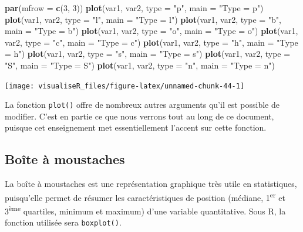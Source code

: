 \documentclass[]{article}
\newenvironment{Shaded}{\begin{snugshade}}{\end{snugshade}}
\newcommand{\DataTypeTok}[1]{\textcolor[rgb]{0.13,0.29,0.53}{#1}}
\newcommand{\DecValTok}[1]{\textcolor[rgb]{0.00,0.00,0.81}{#1}}
\newcommand{\KeywordTok}[1]{\textcolor[rgb]{0.13,0.29,0.53}{\textbf{#1}}}
\newcommand{\NormalTok}[1]{#1}
\newcommand{\StringTok}[1]{\textcolor[rgb]{0.31,0.60,0.02}{#1}}
\begin{document}
\begin{Shaded}
\begin{Highlighting}[]
\KeywordTok{par}\NormalTok{(}\DataTypeTok{mfrow =} \KeywordTok{c}\NormalTok{(}\DecValTok{3}\NormalTok{, }\DecValTok{3}\NormalTok{))}
\KeywordTok{plot}\NormalTok{(var1, var2, }\DataTypeTok{type =} \StringTok{"p"}\NormalTok{, }\DataTypeTok{main =} \StringTok{"Type = p"}\NormalTok{)}
\KeywordTok{plot}\NormalTok{(var1, var2, }\DataTypeTok{type =} \StringTok{"l"}\NormalTok{, }\DataTypeTok{main =} \StringTok{"Type = l"}\NormalTok{)}
\KeywordTok{plot}\NormalTok{(var1, var2, }\DataTypeTok{type =} \StringTok{"b"}\NormalTok{, }\DataTypeTok{main =} \StringTok{"Type = b"}\NormalTok{)}
\KeywordTok{plot}\NormalTok{(var1, var2, }\DataTypeTok{type =} \StringTok{"o"}\NormalTok{, }\DataTypeTok{main =} \StringTok{"Type = o"}\NormalTok{)}
\KeywordTok{plot}\NormalTok{(var1, var2, }\DataTypeTok{type =} \StringTok{"c"}\NormalTok{, }\DataTypeTok{main =} \StringTok{"Type = c"}\NormalTok{)}
\KeywordTok{plot}\NormalTok{(var1, var2, }\DataTypeTok{type =} \StringTok{"h"}\NormalTok{, }\DataTypeTok{main =} \StringTok{"Type = h"}\NormalTok{)}
\KeywordTok{plot}\NormalTok{(var1, var2, }\DataTypeTok{type =} \StringTok{"s"}\NormalTok{, }\DataTypeTok{main =} \StringTok{"Type = s"}\NormalTok{)}
\KeywordTok{plot}\NormalTok{(var1, var2, }\DataTypeTok{type =} \StringTok{"S"}\NormalTok{, }\DataTypeTok{main =} \StringTok{"Type = S"}\NormalTok{)}
\KeywordTok{plot}\NormalTok{(var1, var2, }\DataTypeTok{type =} \StringTok{"n"}\NormalTok{, }\DataTypeTok{main =} \StringTok{"Type = n"}\NormalTok{)}
\end{Highlighting}
\end{Shaded}

\begin{center}\texttt{[image: visualiseR\_files/figure-latex/unnamed-chunk-44-1]} \end{center}

La fonction \texttt{plot()} offre de nombreux autres arguments qu'il est possible de modifier. C'est en partie ce que nous verrons tout au long de ce document, puisque cet enseignement met essentiellement l'accent sur cette fonction.

\hypertarget{bouxeete-uxe0-moustaches}{%
\subsection{Boîte à moustaches}\label{bouxeete-uxe0-moustaches}}

La boîte à moustaches est une représentation graphique très utile en
statistiques, puisqu'elle permet de résumer les caractéristiques de position
(médiane, 1\textsuperscript{er} et 3\textsuperscript{ème} quartiles, minimum et maximum) d'une variable
quantitative. Sous R, la fonction utilisée sera \texttt{boxplot()}.
\end{document}
